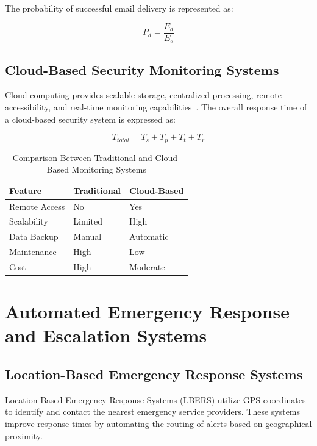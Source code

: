 \documentclass[12pt,a4paper,oneside]{report}
\begin{document}
The probability of successful email delivery is represented as:

\begin{equation}
  P_d = \frac{E_d}{E_s}
\end{equation}

\subsection{Cloud-Based Security Monitoring Systems}

Cloud computing provides scalable storage, centralized processing, remote accessibility, and real-time monitoring capabilities~\cite{ref19,ref21}. The overall response time of a cloud-based security system is expressed as:

\begin{equation}
  T_{total} = T_s + T_p + T_t + T_r
\end{equation}

\begin{table}[htbp]
  \centering
  \caption{Comparison Between Traditional and Cloud-Based Monitoring Systems}
  {\small
  \begin{tabular}{|p{5.00cm}|p{4.00cm}|p{4.00cm}|}
    \hline
    \textbf{Feature} & \textbf{Traditional} & \textbf{Cloud-Based} \\
    \hline
    Remote Access        & No      & Yes \\
    Scalability          & Limited & High \\
    Data Backup          & Manual  & Automatic \\
    Maintenance          & High    & Low \\
    Cost                 & High    & Moderate \\
    \hline
  \end{tabular}
  }
\end{table}

\section{Automated Emergency Response and Escalation Systems}

\subsection{Location-Based Emergency Response Systems}

Location-Based Emergency Response Systems (LBERS) utilize GPS coordinates to identify and contact the nearest emergency service providers. These systems improve response times by automating the routing of alerts based on geographical proximity.
\end{document}

